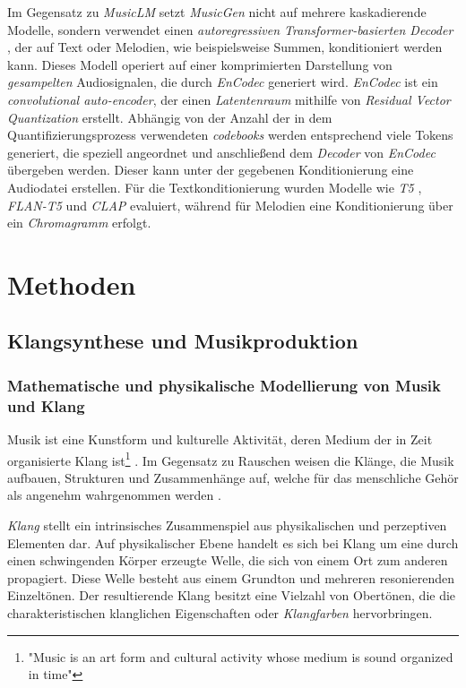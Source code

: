 \documentclass[
  a4paper,  %
  twoside,  %
  bibliography=totoc,
  headsepline,
  cleardoublepage=empty,
  parskip=half,
  draft=false
]{scrbook}
\begin{document}
Im Gegensatz zu \emph{MusicLM} setzt \emph{MusicGen} nicht auf mehrere kaskadierende Modelle, sondern verwendet einen \emph{autoregressiven Transformer-basierten Decoder} \cite{vaswani_attention_2017}, der auf Text oder Melodien, wie beispielsweise Summen, konditioniert werden kann. Dieses Modell operiert auf einer komprimierten Darstellung von \emph{gesampelten} Audiosignalen, die durch \emph{EnCodec} \cite{defossez_high_2022} generiert wird. \emph{EnCodec} ist ein \emph{convolutional auto-encoder}, der einen \emph{Latentenraum} mithilfe von \emph{Residual Vector Quantization} \cite{zeghidour_soundstream_2021} erstellt. Abhängig von der Anzahl der in dem Quantifizierungsprozess verwendeten \emph{codebooks} werden entsprechend viele Tokens generiert, die speziell angeordnet und anschließend dem \emph{Decoder} von \emph{EnCodec} übergeben werden. Dieser kann unter der gegebenen Konditionierung eine Audiodatei erstellen. Für die Textkonditionierung wurden Modelle wie \emph{T5} \cite{raffel_exploring_2020}, \emph{FLAN-T5} \cite{roberts_scaling_2022} und \emph{CLAP} evaluiert, während für Melodien eine Konditionierung über ein \emph{Chromagramm} erfolgt.







\chapter{Methoden}

\section{Klangsynthese und Musikproduktion}

\subsection{Mathematische und physikalische Modellierung von Musik und Klang}\label{sec:music_math}
\glqq Musik ist eine Kunstform und kulturelle Aktivität, deren Medium der in Zeit organisierte Klang ist\grqq \footnote{"Music is an art form and cultural activity whose medium is sound organized in time"} \cite{tsuji_physics_2021}. Im Gegensatz zu Rauschen weisen die Klänge, die Musik aufbauen, Strukturen und Zusammenhänge auf, welche für das menschliche Gehör als angenehm wahrgenommen werden \cite{parker_good_2009}. 

\emph{Klang} stellt ein intrinsisches Zusammenspiel aus physikalischen und perzeptiven Elementen dar. Auf physikalischer Ebene handelt es sich bei Klang um eine durch einen schwingenden Körper erzeugte Welle, die sich von einem Ort zum anderen propagiert. Diese Welle besteht aus einem Grundton und mehreren resonierenden Einzeltönen. Der resultierende Klang besitzt eine Vielzahl von Obertönen, die die charakteristischen klanglichen Eigenschaften oder \emph{Klangfarben} hervorbringen. \cite{tsuji_physics_2021, parker_good_2009}
\end{document}
